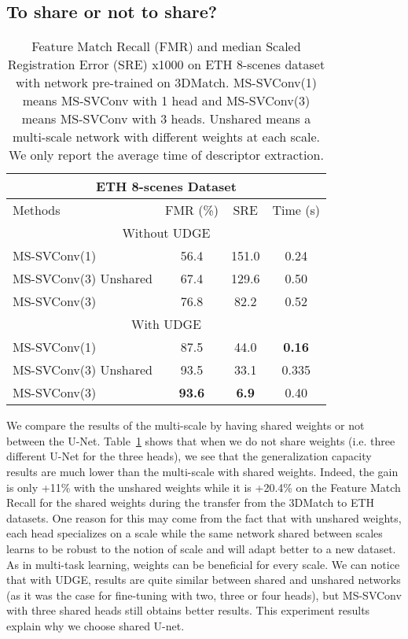 \documentclass[10pt,twocolumn,letterpaper]{article}
\begin{document}
\subsection{To share or not to share?}
\begin{table}[ht]
\small
\centering
\tabcolsep=0.11cm
\begin{tabular}[t]{lccc}
\toprule
\multicolumn{4}{c}{ETH 8-scenes Dataset} \\
\midrule
Methods & FMR (\%) & SRE & Time (s)\\
\midrule
\multicolumn{4}{c}{Without UDGE} \\
MS-SVConv(1) & 56.4 & 151.0 & 0.24  \\
MS-SVConv(3) Unshared & 67.4 & 129.6 & 0.50 \\
MS-SVConv(3) & 76.8 & 82.2 & 0.52 \\
\midrule
\multicolumn{4}{c}{With UDGE} \\
MS-SVConv(1) & 87.5 & 44.0 & \bf{0.16} \\
MS-SVConv(3) Unshared & 93.5& 33.1 & 0.335\\
MS-SVConv(3) & \bf{93.6} & \bf{6.9} & 0.40 \\
\bottomrule
\end{tabular}
\caption{Feature Match Recall (FMR) and median Scaled Registration Error (SRE) x1000 on ETH 8-scenes dataset with network pre-trained on 3DMatch. MS-SVConv(1) means MS-SVConv with 1 head and MS-SVConv(3) means MS-SVConv with 3 heads. Unshared means a multi-scale network with different weights at each scale. We only report the average time of descriptor extraction.}
\label{tab:unshared}
\end{table}

We compare the results of the multi-scale by having shared weights or not between the U-Net. Table~\ref{tab:unshared} shows that when we do not share weights (i.e. three different U-Net for the three heads), we see that the generalization capacity results are much lower than the multi-scale with shared weights. Indeed, the gain is only +11\% with the unshared weights while it is +20.4\% on the Feature Match Recall for the shared weights during the transfer from the 3DMatch to ETH datasets. One reason for this may come from the fact that with unshared weights, each head specializes on a scale while the same network shared between scales learns to be robust to the notion of scale and will adapt better to a new dataset. As in multi-task learning, weights can be beneficial for every scale. We can notice that with UDGE, results are quite similar between shared and unshared networks (as it was the case for fine-tuning with two, three or four heads), but MS-SVConv with three shared heads still obtains better results. This experiment results explain why we choose shared U-net.
\end{document}
